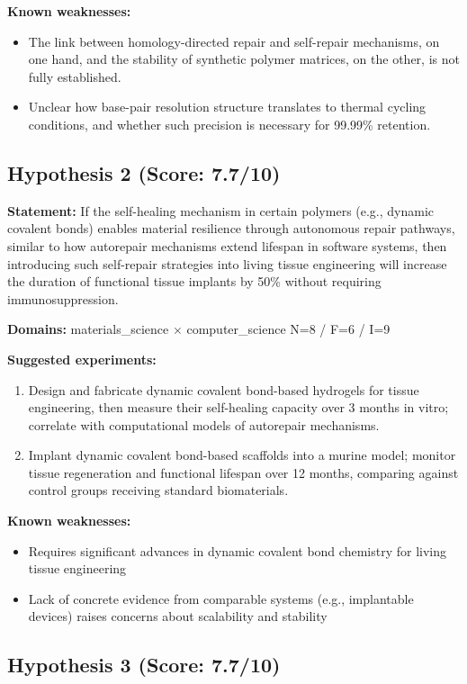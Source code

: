 \documentclass[12pt,a4paper]{article}
\begin{document}
\textbf{Known weaknesses:}
\begin{itemize}
  \item The link between homology-directed repair and self-repair mechanisms, on one hand, and the stability of synthetic polymer matrices, on the other, is not fully established.
  \item Unclear how base-pair resolution structure translates to thermal cycling conditions, and whether such precision is necessary for 99.99\% retention.
\end{itemize}
\subsection*{Hypothesis 2 (Score: 7.7/10)}

\textbf{Statement:} If the self-healing mechanism in certain polymers (e.g., dynamic covalent bonds) enables material resilience through autonomous repair pathways, similar to how autorepair mechanisms extend lifespan in software systems, then introducing such self-repair strategies into living tissue engineering will increase the duration of functional tissue implants by 50\% without requiring immunosuppression.

\noindent\textbf{Domains:} materials\_science $\times$ computer\_science
\hspace{1em} N=8 / F=6 / I=9

\textbf{Suggested experiments:}
\begin{enumerate}
  \item Design and fabricate dynamic covalent bond-based hydrogels for tissue engineering, then measure their self-healing capacity over 3 months in vitro; correlate with computational models of autorepair mechanisms.
  \item Implant dynamic covalent bond-based scaffolds into a murine model; monitor tissue regeneration and functional lifespan over 12 months, comparing against control groups receiving standard biomaterials.
\end{enumerate}

\textbf{Known weaknesses:}
\begin{itemize}
  \item Requires significant advances in dynamic covalent bond chemistry for living tissue engineering
  \item Lack of concrete evidence from comparable systems (e.g., implantable devices) raises concerns about scalability and stability
\end{itemize}
\subsection*{Hypothesis 3 (Score: 7.7/10)}
\end{document}
